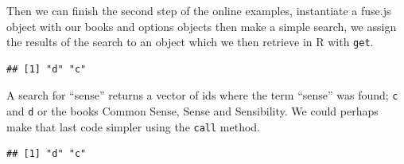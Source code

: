 \documentclass[
]{krantz}
\makeatletter
\newenvironment{Shaded}{\begin{snugshade}}{\end{snugshade}}
\newcommand{\CommentTok}[1]{\textcolor[rgb]{0.37,0.37,0.37}{\textit{#1}}}
\newcommand{\DataTypeTok}[1]{\textcolor[rgb]{0.27,0.27,0.27}{#1}}
\newcommand{\KeywordTok}[1]{\textcolor[rgb]{0.27,0.27,0.27}{\textbf{#1}}}
\newcommand{\NormalTok}[1]{#1}
\newcommand{\OperatorTok}[1]{\textcolor[rgb]{0.43,0.43,0.43}{\textbf{#1}}}
\newcommand{\StringTok}[1]{\textcolor[rgb]{0.5,0.5,0.5}{#1}}
\newenvironment{kframe}{%
\medskip{}
\setlength{\fboxsep}{.8em}
 \def\at@end@of@kframe{}%
 \ifinner\ifhmode%
  \def\at@end@of@kframe{\end{minipage}}%
  \begin{minipage}{\columnwidth}%
 \fi\fi%
 \def\FrameCommand##1{\hskip\@totalleftmargin \hskip-\fboxsep
 \colorbox{shadecolor}{##1}\hskip-\fboxsep
     \hskip-\linewidth \hskip-\@totalleftmargin \hskip\columnwidth}%
 \MakeFramed {\advance\hsize-\width
   \@totalleftmargin\z@ \linewidth\hsize
   \@setminipage}}%
 {\par\unskip\endMakeFramed%
 \at@end@of@kframe}
\renewenvironment{Shaded}{\begin{kframe}}{\end{kframe}}
\makeatother
\begin{document}
\begin{Shaded}
\end{Shaded}

Then we can finish the second step of the online examples, instantiate a fuse.js object with our books and options objects then make a simple search, we assign the results of the search to an object which we then retrieve in R with \texttt{get}.

\begin{Shaded}
\end{Shaded}

\begin{verbatim}
## [1] "d" "c"
\end{verbatim}

A search for ``sense'' returns a vector of ids where the term ``sense'' was found; \texttt{c} and \texttt{d} or the books Common Sense, Sense and Sensibility. We could perhaps make that last code simpler using the \texttt{call} method.

\begin{Shaded}
\end{Shaded}

\begin{verbatim}
## [1] "d" "c"
\end{verbatim}
\end{document}
